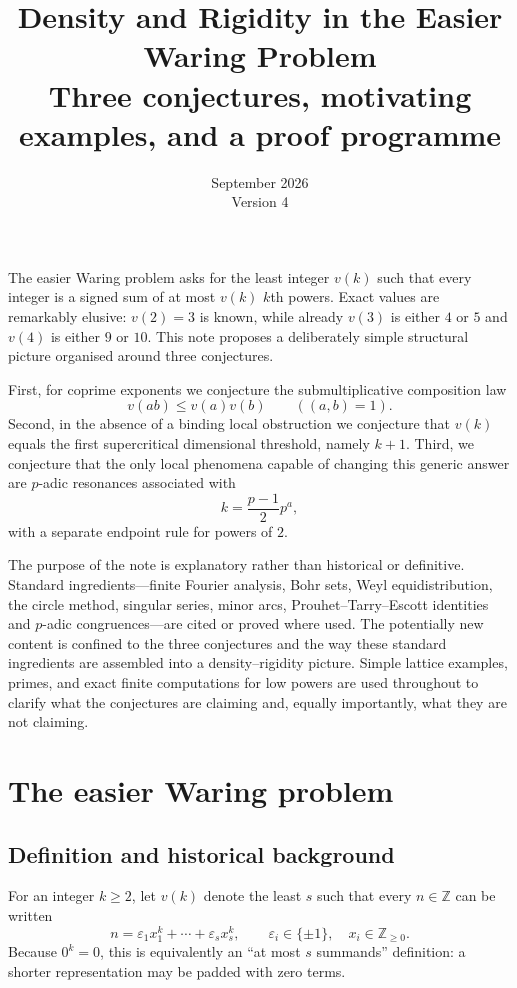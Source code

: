 \documentclass[../Axiomathic.tex]{subfiles}
\title{\textbf{Density and Rigidity in the Easier Waring Problem}\\
\large Three conjectures, motivating examples, and a proof programme}
\author{}
\date{September 2026\\Version 4}
\newcommand{\Z}{\mathbb Z}
\newcommand{\eps}{\varepsilon}
\begin{document}
\maketitle


The easier Waring problem asks for the least integer $v(k)$ such that every integer is a signed sum of at most $v(k)$ $k$th powers.  Exact values are remarkably elusive: $v(2)=3$ is known, while already $v(3)$ is either $4$ or $5$ and $v(4)$ is either $9$ or $10$.  This note proposes a deliberately simple structural picture organised around three conjectures.

First, for coprime exponents we conjecture the submultiplicative composition law
\[
  v(ab)\le v(a)v(b)\qquad ((a,b)=1).
\]
Second, in the absence of a binding local obstruction we conjecture that $v(k)$ equals the first supercritical dimensional threshold, namely $k+1$.  Third, we conjecture that the only local phenomena capable of changing this generic answer are $p$-adic resonances associated with
\[
  k=\frac{p-1}{2}p^a,
\]
with a separate endpoint rule for powers of $2$.

The purpose of the note is explanatory rather than historical or definitive.  Standard ingredients---finite Fourier analysis, Bohr sets, Weyl equidistribution, the circle method, singular series, minor arcs, Prouhet--Tarry--Escott identities and $p$-adic congruences---are cited or proved where used.  The potentially new content is confined to the three conjectures and the way these standard ingredients are assembled into a density--rigidity picture.  Simple lattice examples, primes, and exact finite computations for low powers are used throughout to clarify what the conjectures are claiming and, equally importantly, what they are not claiming.


\tableofcontents
\newpage

\section{The easier Waring problem}

\subsection{Definition and historical background}

For an integer $k\ge2$, let $v(k)$ denote the least $s$ such that every $n\in\Z$ can be written
\begin{equation}\label{eq:def-v}
  n=\eps_1x_1^k+\cdots+\eps_sx_s^k,
  \qquad \eps_i\in\{\pm1\},\quad x_i\in\Z_{\ge0}.
\end{equation}
Because $0^k=0$, this is equivalently an ``at most $s$ summands'' definition: a shorter representation may be padded with zero terms.
\end{document}
